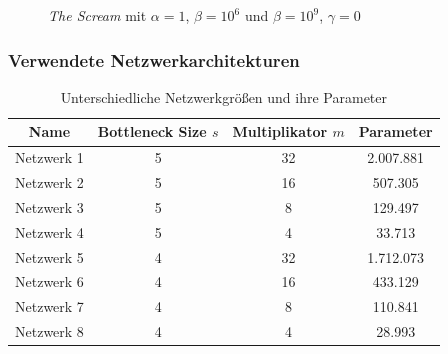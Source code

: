 \begin{frame}
\begin{figure}[H]
\begin{subfigure}[h]{0.49\textwidth}
        \end{subfigure}
        \caption{\textit{The Scream} mit $ \alpha = 1 $, $ \beta = 10^{6} $ und $ \beta = 10^{9} $, $ \gamma = 0 $}
    \end{figure}
\end{frame}


\begin{frame}
    \frametitle{Verwendete Netzwerkarchitekturen}

    \begin{table}[H]
        \centering
        \begin{tabular}{ |c|c|c|c| }
            \hline
            \textbf{Name} & \textbf{Bottleneck Size $ s $} & \textbf{Multiplikator $ m $} & \textbf{Parameter} \\ \hline
            Netzwerk 1 & 5 & 32 & 2.007.881     \\ \hline
            Netzwerk 2 & 5 & 16 & 507.305       \\ \hline
            Netzwerk 3 & 5 & 8  & 129.497       \\ \hline
            Netzwerk 4 & 5 & 4  & 33.713        \\ \hline
    
            Netzwerk 5 & 4 & 32 & 1.712.073     \\ \hline
            Netzwerk 6 & 4 & 16 & 433.129       \\ \hline
            Netzwerk 7 & 4 & 8  & 110.841       \\ \hline
            Netzwerk 8 & 4 & 4  & 28.993        \\ \hline
        \end{tabular}
        \caption{Unterschiedliche Netzwerkgrößen und ihre Parameter}
        \label{tab:networks}
    \end{table}
\end{frame}


